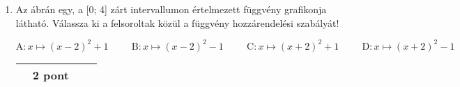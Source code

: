 \documentclass[12pt,a4paper]{article}
\begin{document}
\begin{enumerate}[leftmargin=*,label=\textbf{\large\arabic*.}]
\item 
Az ábrán egy, a [0; 4] zárt intervallumon értelmezett függvény grafikonja látható.
Válassza ki a felsoroltak közül a függvény hozzárendelési szabályát! 


\[\text{A}:x\mapsto(x-2)^2+1\hspace{1cm}\text{B}:x\mapsto(x-2)^2-1\hspace{1cm}\text{C}:x\mapsto(x+2)^2+1\hspace{1cm}\text{D}:x\mapsto(x+2)^2-1\]

\vspace{\fill}
    \begin{flushright}
        \begin{tabular}{|M{6cm}|M{2cm}|M{2cm}|N}
        \hline
         & 
        \vspace{20pt}
         2 pont  &  \\[30pt]
        \hline
        \end{tabular}
    \end{flushright}



\end{enumerate}

\label{LastPage}~
\end{document}
